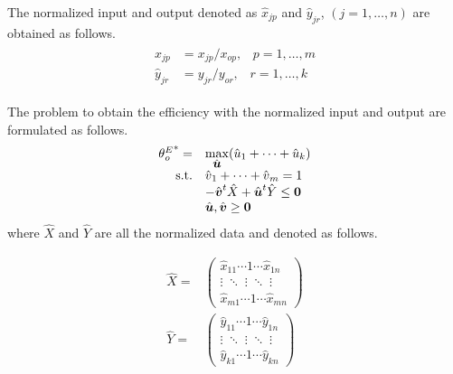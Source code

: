 The normalized input and output denoted as $\hat{\mbox{$x$}}_{jp}$ and $\hat{\mbox{$y$}}_{jr}$, $(j=1,\ldots,n)$ are obtained as follows. 
\begin{eqnarray*}
\begin{array}{ll}
\hat{\mbox{$x$}}_{jp}&={\mbox{$x$}_{jp}}/{\mbox{$x$}_{op}},\;\;\; p=1,\ldots,m \\
\hat{\mbox{$y$}}_{jr}&={\mbox{$y$}_{jr}}/{\mbox{$y$}_{or}},\;\;\; r=1,\ldots,k
\end{array}
\end{eqnarray*}

The problem to obtain the efficiency with the normalized input and output are formulated as follows. 
\begin{equation}\begin{array}{rl}
{\theta{_o^E}}^*= &{\displaystyle\max_{\hat{\mbox{\boldmath$u$}}}  
({\hat{\mbox{$u$}}_1+\cdots+\hat{\mbox{$u$}}_k})} \\
{\rm{s.t.}}
 & {\hat{\mbox{$v$}}_1+\cdots+\hat{\mbox{$v$}}_m} = 1\\
 & -\hat{\mbox{\boldmath$v$}}^t\hat{X}+\hat{\mbox{\boldmath$u$}}^t\hat{Y}  \leq \mbox{\bf 0} \\
& \hat{\mbox{\boldmath$u$}}, \hat{\mbox{\boldmath$v$}}   \geq  \mbox{\bf 0}  \\   
\end{array}
\label{eqn:hatccr}
\end{equation}
where $\hat{X}$ and $\hat{Y}$ are all the normalized data and denoted as follows. 

\[
\begin{array}{rl}
\hat{X}=&\left(
\begin{array}{c}
\hat{\mbox{$x$}}_{11}  \cdots  1  \cdots  \hat{\mbox{$x$}}_{1n}\\
\vdots \; \ddots \; \vdots \; \ddots \; \vdots\\
\hat{\mbox{$x$}}_{m1}  \cdots 1 \cdots  \hat{\mbox{$x$}}_{mn}
\end{array}
\right)\\
\hat{Y}=&\left(
\begin{array}{c}
\hat{\mbox{$y$}}_{11}  \cdots  1  \cdots  \hat{\mbox{$y$}}_{1n}\\
\vdots \; \ddots \; \vdots \; \ddots \; \vdots\\
\hat{\mbox{$y$}}_{k1}  \cdots  1  \cdots  \hat{\mbox{$y$}}_{kn}
\end{array}
\right) \\
\end{array}
\]
 
